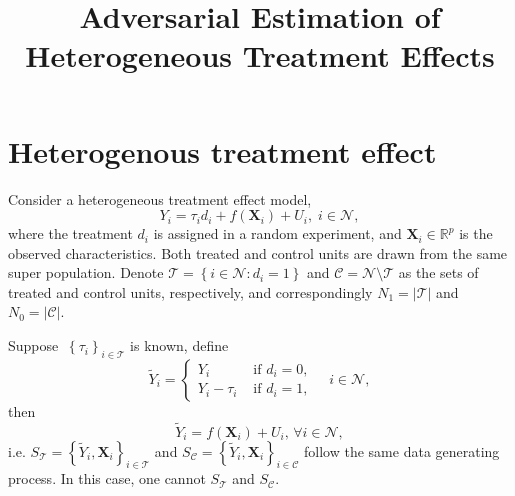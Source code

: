 



\title{Adversarial Estimation of Heterogeneous Treatment Effects}
\date{}


\maketitle

\newpage

\section{Heterogenous treatment effect}

Consider a heterogeneous treatment effect model,
\begin{equation}
    Y_{i}  = \tau _{i}  d_{i} + f\left( \bm{X} _i \right) + U_i,\;  i \in \mathcal{N},
\end{equation}
where the treatment \(d_i\) is assigned in a random experiment, and \(\bm{X} _{i} \in \mathbb{R}^{p} \) is the observed characteristics. Both treated and control units are drawn from the same super population.
Denote 
\(\mathcal{T} =\left\{ i \in \mathcal{N} : d _{i} = 1 \right\} \) and
\(\mathcal{C} = \mathcal{N} \setminus \mathcal{T} \) 
as the sets of treated and control units, respectively, and correspondingly \(N_{1} = \vert \mathcal{T}  \vert \) and \(N_{0} = \vert \mathcal{C}  \vert \).

Suppose \(\ \left\{ \tau _{i}  \right\} _{i \in \mathcal{T} }\)  is known, define
\begin{equation}
    \tilde{Y}_{i}  = \begin{cases}
        Y_{i}  & \text{ if }  d_{i} = 0, \\
        Y_i -\tau _{i} & \text{ if }  d _{i} = 1,
    \end{cases} \quad i \in \mathcal{N},
\end{equation}
then
\[
    \tilde{Y}_{i} = f\left( \bm{X} _{i}  \right) + U_i,\, \forall i\in \mathcal{N}, 
\]
i.e. \(S_{\mathcal{T} } = \left\{ \tilde{Y} _{i} , \bm{X} _{i}  \right\}_{i\in \mathcal{T} } \) and \(S_{\mathcal{\mathcal{C} } } = \left\{ \tilde{Y} _{i} , \bm{X} _{i}  \right\}_{i\in \mathcal{\mathcal{C} } } \) follow the same data generating process. In this case, one cannot \(S_{\mathcal{T} }\) and \(S_{\mathcal{C} }\). 

